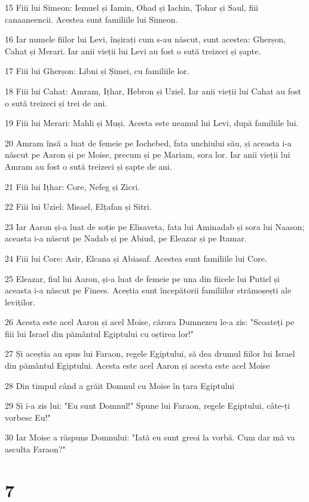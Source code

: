 \par 15 Fiii lui Simeon: Iemuel și Iamin, Ohad și Iachin, Țohar și Saul, fiii canaaneencii. Acestea sunt familiile lui Simeon.
\par 16 Iar numele fiilor lui Levi, înșirați cum s-au născut, sunt acestea: Gherșon, Cahat și Merari. Iar anii vieții lui Levi au fost o sută treizeci și șapte.
\par 17 Fiii lui Gherșon: Libni și Șimei, cu familiile lor.
\par 18 Fiii lui Cahat: Amram, Ițhar, Hebron și Uziel. Iar anii vieții lui Cahat au fost o sută treizeci și trei de ani.
\par 19 Fiii lui Merari: Mahli și Muși. Acesta este neamul lui Levi, după familiile lui.
\par 20 Amram însă a luat de femeie pe Iochebed, fata unchiului său, și aceasta i-a născut pe Aaron și pe Moise, precum și pe Mariam, sora lor. Iar anii vieții lui Amram au fost o sută treizeci și șapte de ani.
\par 21 Fiii lui Ițhar: Core, Nefeg și Zicri.
\par 22 Fiii lui Uziel: Misael, Elțafan și Sitri.
\par 23 Iar Aaron și-a luat de soție pe Elisaveta, fata lui Aminadab și sora lui Naason; aceasta i-a născut pe Nadab și pe Abiud, pe Eleazar și pe Itamar.
\par 24 Fiii lui Core: Asir, Elcana și Abiasaf. Acestea sunt familiile lui Core.
\par 25 Eleazar, fiul lui Aaron, și-a luat de femeie pe una din fiicele lui Putiel și aceasta i-a născut pe Finees. Aceștia sunt începătorii familiilor strămoșești ale leviților.
\par 26 Acesta este acel Aaron și acel Moise, cărora Dumnezeu le-a zis: "Scoateți pe fiii lui Israel din pământul Egiptului cu oștirea lor!"
\par 27 Și aceștia au spus lui Faraon, regele Egiptului, să dea drumul fiilor lui Israel din pământul Egiptului. Acesta este acel Aaron și acesta este acel Moise
\par 28 Din timpul când a grăit Domnul cu Moise în țara Egiptului
\par 29 Și i-a zis lui: "Eu sunt Domnul!" Spune lui Faraon, regele Egiptului, câte-ți vorbesc Eu!"
\par 30 Iar Moise a răspuns Domnului: "Iată eu sunt greoi la vorbă. Cum dar mă va asculta Faraon?"

\chapter{7}

